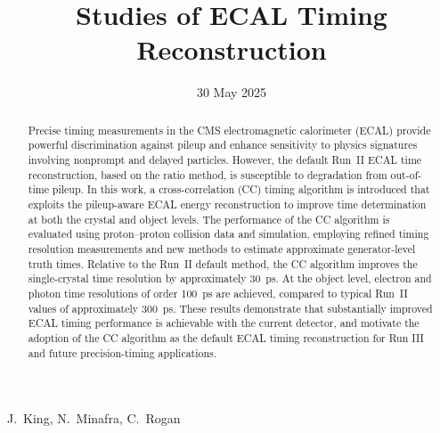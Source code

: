 \documentclass{cmspaper}
\begin{document}

\begin{titlepage}

\title{Studies of ECAL Timing Reconstruction}
\date{30 May 2025}

\begin{Authlist}
  J.~King, N.~Minafra, C.~Rogan
\end{Authlist}


\begin{abstract}
\centering
Precise timing measurements in the CMS electromagnetic calorimeter (ECAL) provide powerful discrimination against pileup and enhance sensitivity to physics signatures involving nonprompt and delayed particles.
However, the default Run~II ECAL time reconstruction, based on the ratio method, is susceptible to degradation from out-of-time pileup.
In this work, a cross-correlation (CC) timing algorithm is introduced that exploits the pileup-aware ECAL energy reconstruction to improve time determination at both the crystal and object levels.
The performance of the CC algorithm is evaluated using proton--proton collision data and simulation, employing refined timing resolution measurements and new methods to estimate approximate generator-level truth times.
Relative to the Run~II default method, the CC algorithm improves the single-crystal time resolution by approximately 30~ps.
At the object level, electron and photon time resolutions of order 100~ps are achieved, compared to typical Run~II values of approximately 300~ps.
These results demonstrate that substantially improved ECAL timing performance is achievable with the current detector, and motivate the adoption of the CC algorithm as the default ECAL timing reconstruction for Run III and future precision-timing applications.
\end{abstract}


\end{titlepage}

\setcounter{page}{2}
\tableofcontents
\clearpage
\linenumbers
\end{document}
